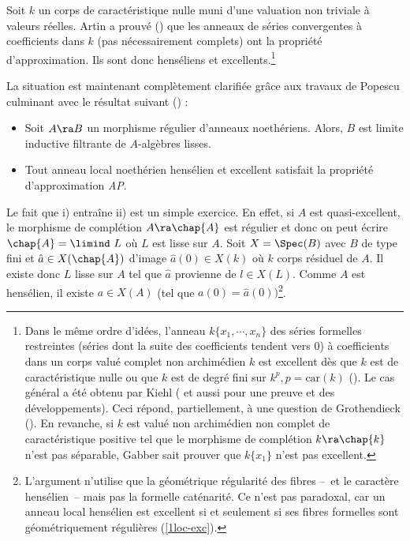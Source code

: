 \documentclass[10pt]{../fichiers-configuration-latex/smfart}
\begin{document}
Soit $k$ un corps de caractéristique nulle muni d'une valuation non triviale à valeurs réelles.
Artin a prouvé (\cite{Art68}) que les anneaux de séries convergentes à coefficients dans $k$ (pas
nécessairement complets) ont la propriété d'approximation. Ils sont donc henséliens et
excellents.\footnote{Dans le même ordre d'idées, l'anneau $k\{x_1,\cdots,x_n\}$ des séries formelles
restreintes (séries dont la suite des coefficients tendent vers $0$) à coefficients dans un corps
valué complet non archimédien $k$ est excellent dès que $k$ est de caractéristique nulle ou que $k$
est de degré fini sur $k^p, p=\text{car}(k)$ (\cite{Gre-Val74}). Le cas général a été obtenu par
Kiehl (\cite{Kie69} et aussi \cite{Con99} pour une preuve et des développements). Ceci répond,
partiellement, à une question de Grothendieck (). En revanche, si $k$ est
valué non archimédien non complet de caractéristique positive tel que le morphisme de complétion
$k\ra\chap{k}$ n'est pas séparable, Gabber sait prouver que $k\{x_1\}$ n'est pas excellent.}

La situation est maintenant complètement clarifiée grâce aux travaux de Popescu culminant avec le
résultat suivant (\cite{NPD@Swan}) :

\begin{theoreme}[Popescu] \label{1-Artin-Popescu}\begin{itemize} \item [i)]Soit $A\ra B$ un
morphisme   régulier d'anneaux noethériens. Alors, $B$ est limite inductive filtrante de
$A$-algèbres lisses.  \item [ii)] Tout anneau local noethérien hensélien et excellent satisfait la
propriété d'approximation \emph{AP}\footnotemark.  \end{itemize} \end{theoreme} 

Le fait que i) entraîne ii) est un simple exercice. En effet, si $A$ est quasi-excellent, le
morphisme de complétion $A\ra \chap{A}$ est régulier et donc on peut écrire $\chap{A}=\limind\ L$ où
$L$ est lisse sur $A$. Soit $X=\Spec(B)$ avec $B$ de type fini et $\hat a\in X(\chap{A})$ d'image
$\hat a(0)\in X(k)$ où $k$ corps résiduel de $A$.  Il existe donc $L$ lisse sur $A$ tel que $\hat a$
provienne de $l\in X(L)$. Comme $A$ est hensélien, il existe $a\in X(A)$ (tel que $a(0)=\hat
a(0))$\footnote{L'argument n'utilise que la géométrique régularité des fibres -- et le caractère
hensélien -- mais pas la formelle caténarité. Ce n'est pas paradoxal, car un anneau local hensélien
est excellent si et seulement si ses fibres formelles sont géométriquement régulières
(\ref{1loc-exc}).}.
\end{document}
